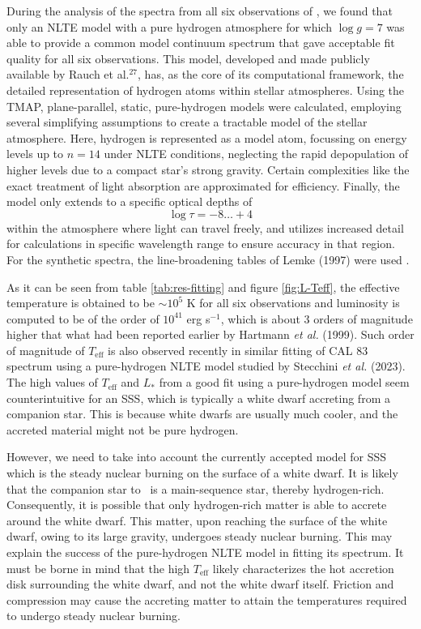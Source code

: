     During the analysis of the spectra from all six observations of \source, we found that only an NLTE model with a pure hydrogen atmosphere for which $\log{g}=7$ was able to provide a common model continuum spectrum that gave acceptable fit quality for all six observations. This model, developed and made publicly available by Rauch et al.$^{27}$, has, as the core of its computational framework, the detailed representation of hydrogen atoms within stellar atmospheres. Using the TMAP,  plane-parallel, static, pure-hydrogen models were calculated, employing several simplifying assumptions to create a tractable model of the stellar atmosphere. Here, hydrogen is represented as a model atom, focussing on energy levels up to $n=14$ under NLTE conditions, neglecting the rapid depopulation of higher levels due to a compact star's strong gravity. Certain complexities like the exact treatment of light absorption are approximated for efficiency. Finally, the model only extends to a specific optical depths of
    $$\log{\tau}=-8\dots+4$$
    within the atmosphere where light can travel freely, and utilizes increased detail for calculations in specific wavelength range to ensure accuracy in that region. For the synthetic spectra, the line-broadening tables of Lemke (1997) were used \cite{lemke1997extended}.
    
    As it can be seen from table \ref{tab:res-fitting} and figure \ref{fig:L-Teff}, the effective temperature is obtained to be $\sim 10^5$ K for all six observations and luminosity is computed to be of the order of $10^{41}$ erg s$^{-1}$, which is about 3 orders of magnitude higher that what had been reported earlier by Hartmann \textit{et al.} (1999). %
    Such order of magnitude of $T_\text{eff}$ is also observed recently in similar fitting of CAL 83 spectrum using a pure-hydrogen NLTE model studied by Stecchini \textit{et al.} (2023). %
    The high values of $T_\text{eff}$ and $L_*$ from a good fit using a pure-hydrogen model seem counterintuitive for an SSS, which is typically a white dwarf accreting from a companion star. This is because white dwarfs are usually much cooler, and the accreted material might not be pure hydrogen.
    
    However, we need to take into account the currently accepted model for SSS which is the steady nuclear burning on the surface of a white dwarf. It is likely that the companion star to \source\ is a main-sequence star, thereby hydrogen-rich. Consequently, it is possible that only hydrogen-rich matter is able to accrete around the white dwarf. This matter, upon reaching the surface of the white dwarf, owing to its large gravity, undergoes steady nuclear burning. This may explain the success of the pure-hydrogen NLTE model in fitting its spectrum. It must be borne in mind that the high $T_\text{eff}$ likely characterizes the hot accretion disk surrounding the white dwarf, and not the white dwarf itself. Friction and compression may cause the accreting matter to attain the temperatures required to undergo steady nuclear burning.
    
